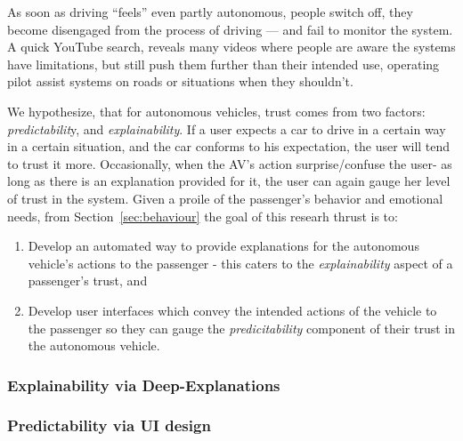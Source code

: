 As soon as driving ``feels'' even partly autonomous, people switch off, they become disengaged from the process of driving — and fail to monitor the system. 
A quick YouTube search, reveals many videos where people are aware the systems have limitations, but still push them further than their intended use, operating pilot assist systems on roads or situations when they shouldn't.

We hypothesize, that for autonomous vehicles, trust comes from two factors: \textit{predictabilit}y, and \textit{explainability}.
If a user expects a car to drive in a certain way in a certain situation, and the car conforms to his expectation, the user will tend to trust it more.
Occasionally, when the AV’s action surprise/confuse the user- as long as there is an explanation provided for it, the user can again gauge her level of trust in the system.
Given a proile of the passenger's behavior and emotional needs, from Section~\ref{sec:behaviour} the goal of this researh thrust is to:
\begin{enumerate}[itemsep=0pt,parsep=0pt,topsep=4pt,leftmargin=0.4in]
    \item Develop an automated way to provide explanations for the autonomous vehicle's actions to the passenger - this caters to the \textit{explainability} aspect of a passenger's trust, and
    \item Develop user interfaces which convey the intended actions of the vehicle to the passenger so they can gauge the \textit{predicitability} component of their trust in the autonomous vehicle.
\end{enumerate}





\subsubsection{Explainability via Deep-Explanations }
\label{subsec:explainability}


\subsubsection{Predictability via UI design}
\label{subsec:uid}
